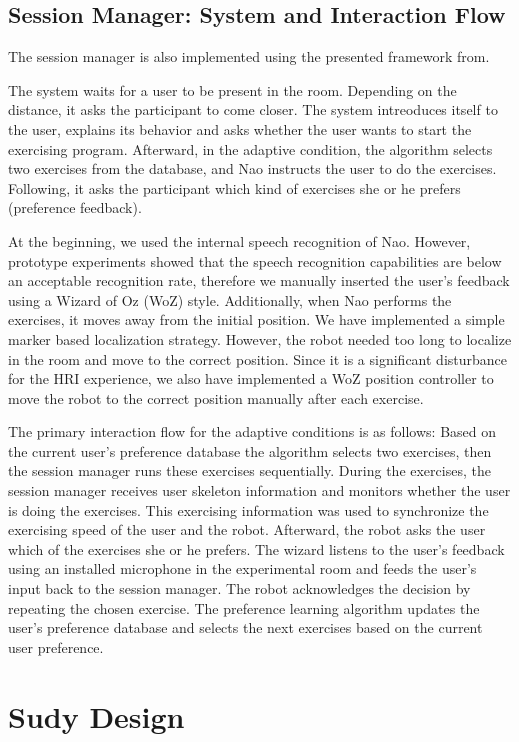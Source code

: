 \subsection{Session Manager: System and Interaction Flow }
The session manager is also implemented using the presented framework from\cite{schneider2017framework}.

The system waits for a user to be present in the room. Depending on the distance, it asks the participant to come closer. The system intreoduces itself to the user, explains its behavior and asks whether the user wants to start the exercising program. Afterward, in the adaptive condition, the algorithm selects two exercises from the database, and Nao instructs the user to do the exercises. Following, it asks the participant which kind of exercises she or he prefers (preference feedback). 

At the beginning, we used the internal speech recognition of Nao. However, prototype experiments showed that the speech recognition capabilities are below an acceptable recognition rate, therefore we manually inserted the user's feedback using a Wizard of Oz (WoZ) style. 
Additionally, when Nao performs the exercises, it moves away from the initial position. We have implemented a simple marker based localization strategy. However, the robot needed too long to localize in the room and move to the correct position. Since it is a significant disturbance for the HRI experience, we also have implemented a WoZ position controller to move the robot to the correct position manually after each exercise. 

The primary interaction flow for the adaptive conditions is as follows: Based on the current user's preference database the algorithm selects two exercises, then the session manager runs these exercises sequentially. During the exercises, the session manager receives user skeleton information and monitors whether the user is doing the exercises. This exercising information was used to synchronize the exercising speed of the user and the robot. 
Afterward, the robot asks the user which of the exercises she or he prefers. The wizard listens to the user's feedback using an installed microphone in the experimental room and feeds the user's input back to the session manager. The robot acknowledges the decision by repeating the chosen exercise. The preference learning algorithm updates the user's preference database and selects the next exercises based on the current user preference. 

\section{Sudy Design} \label{adaptation:sec:study}

